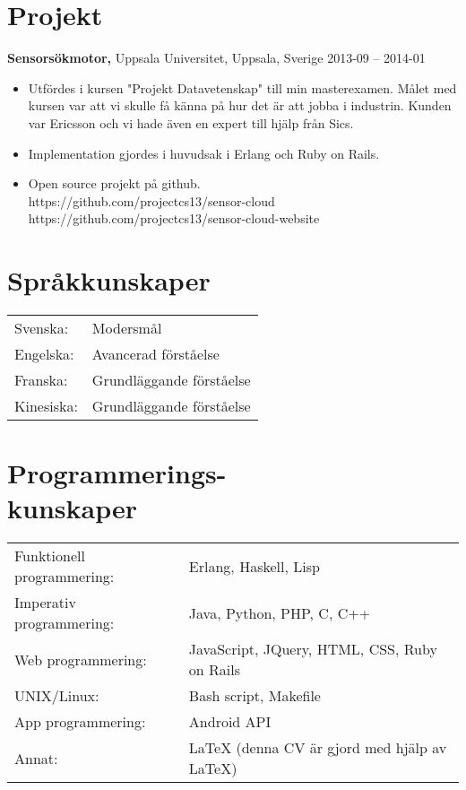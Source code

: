 \documentclass[margin]{res}
\begin{document}
\begin{resume}
\section{Projekt}
{\bf Sensorsökmotor,} Uppsala Universitet, Uppsala, Sverige \hfill 2013-09 -- 2014-01
 \begin{itemize} \itemsep -2pt  %
 \item Utfördes i kursen "Projekt Datavetenskap" till min masterexamen. Målet med kursen var att vi skulle få känna på hur det är att jobba i industrin. Kunden var Ericsson och vi hade även en expert till hjälp från Sics.
 \item Implementation gjordes i huvudsak i Erlang och Ruby on Rails.
 \item Open source projekt på github. \\
 https://github.com/projectcs13/sensor-cloud\\
 https://github.com/projectcs13/sensor-cloud-website
 \end{itemize}


\section{Språkkunskaper}
   \begin{tabular}{l p{3in}}
    Svenska:  & Modersmål \\
    Engelska: & Avancerad förståelse  \\
    Franska:  & Grundläggande förståelse \\
    Kinesiska:& Grundläggande förståelse
 \end{tabular}

\section{Programmerings- \\ kunskaper}
   \begin{tabular}{l p{3in}}
    Funktionell programmering: & Erlang, Haskell, Lisp \\
    Imperativ programmering: & Java, Python, PHP, C, C++ \\
    Web programmering: & JavaScript, JQuery, HTML, CSS, Ruby on Rails \\
    UNIX/Linux: & Bash script, Makefile \\
    App programmering: & Android API \\
    Annat: & LaTeX (denna CV är gjord med hjälp av LaTeX)
 \end{tabular}


\end{resume}
\end{document}
